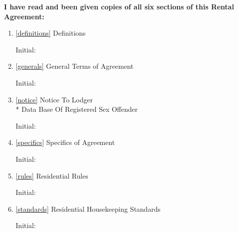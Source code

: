 \documentclass[12pt,letterpaper]{article}
\newcommand{\definitions}{Definitions} %
\newcommand{\generals}{General Terms of Agreement}	%
\newcommand{\notice}{Notice To Lodger\\* Data Base Of Registered Sex Offender} %
\newcommand{\specifics}{Specifics of Agreement}			%
\newcommand{\rules}{Residential Rules}							%
\newcommand{\standards}{Residential Housekeeping Standards}	%
\begin{document}
\noindent \textbf{I have read and been given copies of all six sections of this Rental Agreement:}

\begin{enumerate}
	\item 
		\begin{minipage}[t]{0.55\textwidth}
			\ref{definitions} \definitions{}
		\end{minipage}
		\hfill
		\begin{minipage}[t]{0.35\textwidth}
				Initial:\hspace{0.2cm}\makebox[1.5cm]{\hrulefill}
		\end{minipage}
	\item 
		\begin{minipage}[t]{0.55\textwidth}
			\ref{generals} \generals{}
		\end{minipage}
		\hfill
		\begin{minipage}[t]{0.35\textwidth}
				Initial:\hspace{0.2cm}\makebox[1.5cm]{\hrulefill}
		\end{minipage}
	\item 
		\begin{minipage}[t]{0.55\textwidth}
			\ref{notice} \notice{}
		\end{minipage}
		\hfill
		\begin{minipage}[t]{0.35\textwidth}
				Initial:\hspace{0.2cm}\makebox[1.5cm]{\hrulefill}
		\end{minipage}
	\item 
		\begin{minipage}[t]{0.55\textwidth}
			\ref{specifics} \specifics{}
		\end{minipage}
		\hfill
		\begin{minipage}[t]{0.35\textwidth}
				Initial:\hspace{0.2cm}\makebox[1.5cm]{\hrulefill}
		\end{minipage}
	\item 
		\begin{minipage}[t]{0.55\textwidth}
			\ref{rules} \rules{}
		\end{minipage}
		\hfill
		\begin{minipage}[t]{0.35\textwidth}
				Initial:\hspace{0.2cm}\makebox[1.5cm]{\hrulefill}
		\end{minipage}
	\item 
		\begin{minipage}[t]{0.55\textwidth}
			\ref{standards} \standards{}
		\end{minipage}
		\hfill
		\begin{minipage}[t]{0.35\textwidth}
				Initial:\hspace{0.2cm}\makebox[1.5cm]{\hrulefill}
		\end{minipage}
\end{enumerate}
\end{document}
